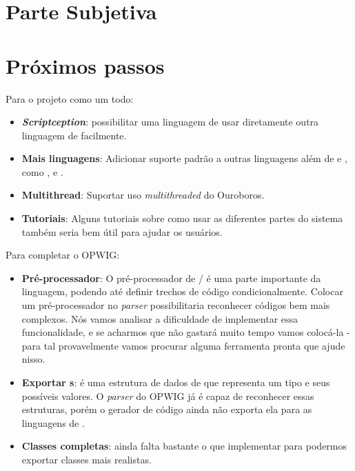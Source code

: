 \chapter*{Parte Subjetiva}
\label{sec:parte_subjetiva}

\newcommand\materia[3]{\noindent \textbf{#1} - \texttt{#2}\\\indent #3\vspace{0.5cm}\\}





\chapter{Próximos passos}
\label{cap:proximos_passos}

Para o projeto como um todo:
\begin{itemize}
  \item \emph{\textbf{Scriptception}}: possibilitar uma linguagem de \script{} usar diretamente
    outra linguagem de \script{} facilmente.
  \item \textbf{Mais linguagens}: Adicionar suporte padrão a outras linguagens além de 
    e , como ,  e .
  \item \textbf{Multithread}: Suportar uso \textit{multithreaded} do Ouroboros.
  \item \textbf{Tutoriais}: Alguns tutoriais sobre como usar as diferentes partes do
    sistema também seria bem útil para ajudar os usuários.
\end{itemize}

Para completar o OPWIG:
\begin{itemize}
  \item \textbf{Pré-processador}: O pré-processador de \C{}/\CXX{} é uma parte 
    importante da linguagem, podendo até definir trechos de código condicionalmente.
    Colocar um pré-processador no \textit{parser} possibilitaria reconhecer
    códigos \CXX{} bem mais complexos. Nós vamos analisar a dificuldade de implementar
    essa funcionalidade, e se acharmos que não gastará muito tempo vamos colocá-la -
    para tal provavelmente vamos procurar alguma ferramenta pronta que ajude nisso.
  \item \textbf{Exportar s}:  é uma estrutura de dados de \CXX{} 
    que representa um tipo e seus possíveis valores. O \textit{parser} do OPWIG já
    é capaz de reconhecer essas estruturas, porém o gerador de código ainda não
    exporta ela para as linguagens de \script{}.
  \item \textbf{Classes completas}: ainda falta bastante o que implementar para podermos
    exportar classes mais realistas.
\end{itemize}
